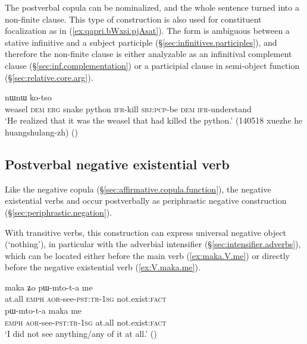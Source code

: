 The postverbal copula can be nominalized, and the whole sentence turned into a non-finite clause. This type of construction is also used for constituent focalization  as in (\ref{ex:qapri.bWxsi.pjAsat}). The form  is ambiguous between a stative infinitive and a subject participle (§\ref{sec:infinitives.participles}), and therefore the non-finite clause is either analyzable as an infinitival complement clause (§\ref{sec:inf.complementation}) or a participial clause in semi-object function (§\ref{sec:relative.core.arg}).

\begin{exe}
\ex \label{ex:qapri.bWxsi.pjAsat}
 nɯnɯ ko-tso \\
weasel \textsc{dem} \textsc{erg} snake python \textsc{ifr}-kill \textsc{sbj}:\textsc{pcp}-be \textsc{dem} \textsc{ifr}-understand \\
\glt `He realized that it was the weasel that had killed the python.' (140518 xuezhe he huangshulang-zh)
()
\end{exe}

\subsection{Postverbal negative existential verb} \label{sec:negation.existential}
Like the negative copula  (§\ref{sec:affirmative.copula.function}), the negative existential verbs  and   occur postverbally as periphrastic negative construction (§\ref{sec:periphrastic.negation}).

With transitive verbs, this construction can express universal negative object (`nothing'), in particular with the adverbial intensifier  (§\ref{sec:intensifier.adverbs}), which can be located either before the main verb (\ref{ex:maka.V.me}) or directly before the negative existential verb  (\ref{ex:V.maka.me}). 

\begin{exe}
\ex 
\begin{xlist}
\ex \label{ex:maka.V.me}
\gll maka ʑo pɯ-mto-t-a me \\
at.all \textsc{emph} \textsc{aor}-see-\textsc{pst}:\textsc{tr}-\textsc{1sg} not.exist:\textsc{fact} \\
\ex \label{ex:V.maka.me}
\gll pɯ-mto-t-a maka me \\
\textsc{emph} \textsc{aor}-see-\textsc{pst}:\textsc{tr}-\textsc{1sg} at.all  not.exist:\textsc{fact} \\
\glt `I did not see anything/any of it at all.' ()
\end{xlist}
\end{exe}

